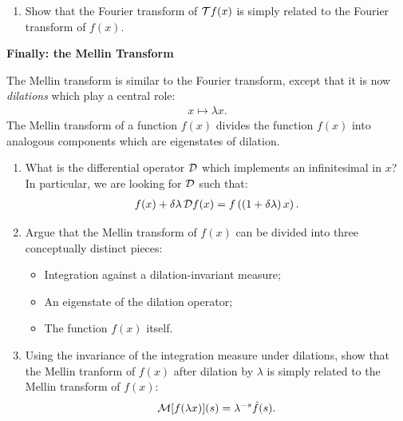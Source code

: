 \begin{subappendices}
\begin{exercise}
\begin{enumerate}[label=\roman*)]
        \item
            Show that the Fourier transform of \(\mathcal{T} f(x)\) is simply related to the Fourier transform of \(f(x)\).
    \end{enumerate}
\end{exercise}

\begin{exercise}
    \textbf{Finally: the Mellin Transform}

    The Mellin transform is similar to the Fourier transform, except that it is now \emph{dilations} which play a central role:
    \begin{align}
        x \mapsto \lambda x
        .
    \end{align}
    The Mellin transform of a function \(f(x)\) divides the function \(f(x)\) into analogous components which are eigenstates of dilation.

    \begin{enumerate}[label=\roman*)]
        \item
            What is the differential operator \(\mathcal{D}\) which implements an infinitesimal  in \(x\)?
            In particular, we are looking for \(\mathcal{D}\) such that:
            \begin{align}
                f(x) + \delta \lambda \, \mathcal{D} f(x)
                =
                f\left(\left(1 + \delta \lambda\right)x\right)
                .
            \end{align}

        \item
            Argue that the Mellin transform of \(f(x)\) can be divided into three conceptually distinct pieces:
            \begin{itemize}
                \item
                    Integration against a dilation-invariant measure;

                \item
                    An eigenstate of the dilation operator;

                \item
                    The function \(f(x)\) itself.
            \end{itemize}

        \item
            Using the invariance of the integration measure under dilations, show that the Mellin tranform of \(f(x)\) after dilation by \(\lambda\) is simply related to the Mellin transform of \(f(x)\):
            \begin{align}
                \mathcal{M}[f(\lambda x)](s) = \lambda^{-s} \hat f(s)
                .
            \end{align}


\end{enumerate}
\end{exercise}
\end{subappendices}
